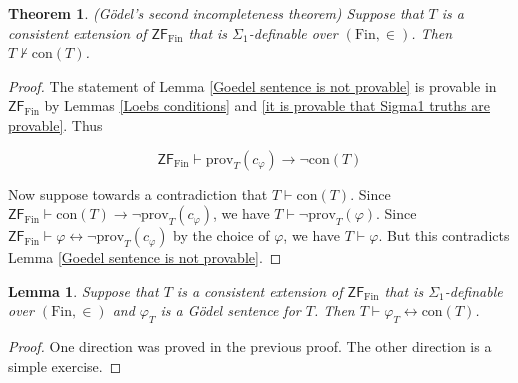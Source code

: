 \documentclass[a4paper, 11pt]{amsart}
\newtheorem{theorem}{Theorem}[subsection]
\newtheorem{lemma}[lemma]{Lemma}
\theoremstyle{remark}
\newcommand{\axiomft}[1]{\mathsf{#1}}
\newcommand{\ZF}{\axiomft{ZF}}
\newcommand{\Fin}{\mathrm{Fin}}
\newcommand{\prov}{\mathrm{prov}}
\begin{document}
\begin{theorem}(G\"odel's second incompleteness theorem) 
\label{second incompleteness theorem} 
Suppose that $T$ is a consistent extension of $\ZF_\Fin$ that is $\Sigma_1$-definable over $(\Fin,\in)$. 
Then $T \not \vdash \mathrm{con}(T)$. 
\end{theorem} 
\begin{proof} 
The statement of Lemma \ref{Goedel sentence is not provable} is provable in $\ZF_\Fin$ by Lemmas \ref{Loebs conditions} and \ref{it is provable that Sigma1 truths are provable}. 
Thus 

$$  \ZF_\Fin \vdash   \prov_T(c_\varphi) \rightarrow \neg\mathrm{con}(T) $$ 

Now suppose towards a contradiction that $T \vdash \mathrm{con}(T)$. 
Since $ \ZF_\Fin \vdash  \mathrm{con}(T)    \rightarrow  \neg\prov_T(c_\varphi) $, we have $T\vdash \neg\prov_T(\varphi)$. 
Since $\ZF_\Fin \vdash  \varphi \longleftrightarrow \neg \prov_T(c_\varphi)  $ by the choice of $\varphi$, 
we have $T\vdash \varphi$. 
But this contradicts Lemma \ref{Goedel sentence is not provable}. 
\end{proof} 

\begin{lemma} 
\label{Goedel sentence is equivalent to conT} 
Suppose that $T$ is a consistent extension of $\ZF_\Fin$ that is $\Sigma_1$-definable over $(\Fin,\in)$ and $\varphi_T$ is a G\"odel sentence for $T$. 
Then $T \vdash \varphi_T \longleftrightarrow \mathrm{con}(T)$. 
\end{lemma} 
\begin{proof} 
One direction was proved in the previous proof. 
The other direction is a simple exercise. 
\end{proof} 
\end{document}
